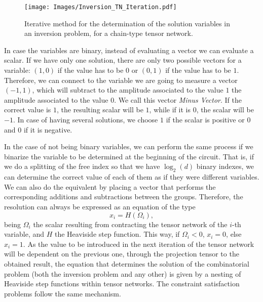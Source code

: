 \begin{figure}
    \centering
    \texttt{[image: Images/Inversion\_TN\_Iteration.pdf]}
    \caption{Iterative method for the determination of the solution variables in an inversion problem, for a chain-type tensor network.}
    \label{fig: Inversion iteration}
\end{figure}

In case the variables are binary, instead of evaluating a vector we can evaluate a scalar. If we have only one solution, there are only two possible vectors for a variable: $(1,0)$ if the value has to be $0$ or $(0,1)$ if the value has to be $1$. Therefore, we can connect to the variable we are going to measure a vector $(-1,1)$, which will subtract to the amplitude associated to the value $1$ the amplitude associated to the value $0$. We call this vector \textit{Minus Vector}. If the correct value is $1$, the resulting scalar will be $1$, while if it is $0$, the scalar will be $-1$. In case of having several solutions, we choose $1$ if the scalar is positive or $0$ and $0$ if it is negative.

In the case of not being binary variables, we can perform the same process if we binarize the variable to be determined at the beginning of the circuit. That is, if we do a splitting of the free index so that we have $\log_2(d)$ binary indexes, we can determine the correct value of each of them as if they were different variables. We can also do the equivalent by placing a vector that performs the corresponding additions and subtractions between the groups.
Therefore, the resolution can always be expressed as an equation of the type
\begin{equation}
    x_i = H(\Omega_i),
\end{equation}
being $\Omega_i$ the scalar resulting from contracting the tensor network of the $i$-th variable, and $H$ the Heaviside step function. This way, if $\Omega_i<0$, $x_i=0$, else $x_i=1$. As the value to be introduced in the next iteration of the tensor network will be dependent on the previous one, through the projection tensor to the obtained result, the equation that determines the solution of the combinatorial problem (both the inversion problem and any other) is given by a nesting of Heaviside step functions within tensor networks. The constraint satisfaction problems follow the same mechanism.


